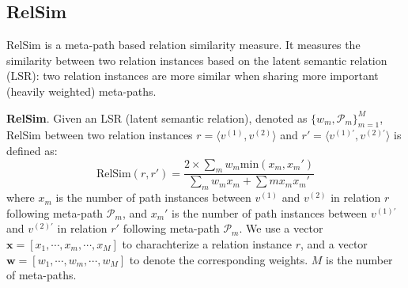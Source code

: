 \documentclass{acm_proc_article-csis8101}
\begin{document}
\subsection{RelSim}

RelSim \cite{wang2016relsim} is a meta-path based relation similarity measure. It measures the similarity between two relation instances based on the latent semantic relation (LSR): two relation instances are more similar when sharing more important (heavily weighted) meta-paths.

\begin{definition}
{\bf RelSim}. Given an LSR (latent semantic relation), denoted as $\{w_{m}, \mathcal{P}_{m}\}^{M}_{m=1}$, RelSim between two 
relation instances $r = \langle v^{(1)}, v^{(2)} \rangle$ and $r' = \langle v^{(1)'}, v^{(2)'} \rangle$ is defined as:
\begin{equation}
\text{RelSim}(r, r') = \frac{2 \times \sum_{m}w_{m}\text{min}(x_{m}, x_{m}')}{\sum_{m}w_{m}x_{m}+\sum{m}x_{m}x_{m}'}
\end{equation}
where $x_{m}$ is the number of path instances between $v^{(1)}$ and $v^{(2)}$ in relation $r$ following meta-path $\mathcal{P}_{m}$, and $x_{m}'$ is the number of path instances between $v^{(1)'}$ and $v^{(2)'}$ in relation $r'$ following meta-path $\mathcal{P}_{m}$. We use a vector $\mathbf{x}=[x_1, \cdots, x_m, \cdots, x_{M}]$ to charachterize a relation instance $r$, and a vector $\mathbf{w}=[w_{1}, \cdots, w_{m}, \cdots, w_{M}]$ to denote the corresponding weights. $M$ is the number of meta-paths.
\end{definition}

\end{document}
